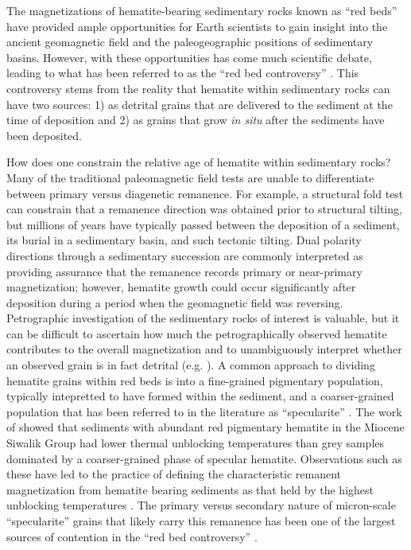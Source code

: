 \documentclass[11pt,letterpaper]{article}
\begin{document}
The magnetizations of hematite-bearing sedimentary rocks known as ``red beds'' have provided ample opportunities for Earth scientists to gain insight into the ancient geomagnetic field and the paleogeographic positions of sedimentary basins. However, with these opportunities has come much scientific debate, leading to what has been referred to as the ``red bed controversy'' \citep{Butler1992a, Beck2003b, Van-Der-Voo2012a}. This controversy stems from the reality that hematite within sedimentary rocks can have two sources: 1) as detrital grains that are delivered to the sediment at the time of deposition and 2) as grains that grow \textit{in situ} after the sediments have been deposited.

How does one constrain the relative age of hematite within sedimentary rocks? Many of the traditional paleomagnetic field tests are unable to differentiate between primary versus diagenetic remanence. For example, a structural fold test can constrain that a remanence direction was obtained prior to structural tilting, but millions of years have typically passed between the deposition of a sediment, its burial in a sedimentary basin, and such tectonic tilting. Dual polarity directions through a sedimentary succession are commonly interpreted as providing assurance that the remanence records primary or near-primary magnetization; however, hematite growth could occur significantly after deposition during a period when the geomagnetic field was reversing. Petrographic investigation of the sedimentary rocks of interest is valuable, but it can be difficult to ascertain how much the petrographically observed hematite contributes to the overall magnetization and to unambiguously interpret whether an observed grain is in fact detrital (e.g. \citealp{Elmore1982a}). A common approach to dividing hematite grains within red beds is into a fine-grained pigmentary population, typically intepretted to have formed within the sediment, and a coarser-grained population that has been referred to in the literature as ``specularite'' \citep{Butler1992a, Van-Der-Voo2012a}. The work of \cite{Tauxe1980a} showed that sediments with abundant red pigmentary hematite in the Miocene Siwalik Group had lower thermal unblocking temperatures than grey samples dominated by a coarser-grained phase of specular hematite. Observations such as these have led to the practice of defining the characteristic remanent magnetization from hematite bearing sediments as that held by the highest unblocking temperatures \citep{Van-Der-Voo2012a}.  The primary versus secondary nature of micron-scale ``specularite'' grains that likely carry this remanence has been one of the largest sources of contention in the ``red bed controversy'' \citep{Van-Houten1968a, Tauxe1980a, Butler1992a, Van-Der-Voo2012a}.
\end{document}
